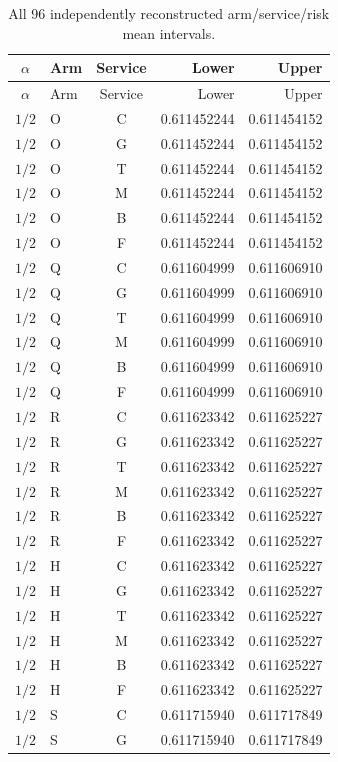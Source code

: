 \small\begin{longtable}{clcrr}
\caption{All 96 independently reconstructed arm/service/risk mean intervals.}\label{tab:means96d}\\
\hline $\alpha$ & Arm & Service & Lower & Upper \\ \hline\endfirsthead
\hline $\alpha$ & Arm & Service & Lower & Upper \\ \hline\endhead
$1/2$ & O & C & 0.611452244 & 0.611454152 \\
$1/2$ & O & G & 0.611452244 & 0.611454152 \\
$1/2$ & O & T & 0.611452244 & 0.611454152 \\
$1/2$ & O & M & 0.611452244 & 0.611454152 \\
$1/2$ & O & B & 0.611452244 & 0.611454152 \\
$1/2$ & O & F & 0.611452244 & 0.611454152 \\
$1/2$ & Q & C & 0.611604999 & 0.611606910 \\
$1/2$ & Q & G & 0.611604999 & 0.611606910 \\
$1/2$ & Q & T & 0.611604999 & 0.611606910 \\
$1/2$ & Q & M & 0.611604999 & 0.611606910 \\
$1/2$ & Q & B & 0.611604999 & 0.611606910 \\
$1/2$ & Q & F & 0.611604999 & 0.611606910 \\
$1/2$ & R & C & 0.611623342 & 0.611625227 \\
$1/2$ & R & G & 0.611623342 & 0.611625227 \\
$1/2$ & R & T & 0.611623342 & 0.611625227 \\
$1/2$ & R & M & 0.611623342 & 0.611625227 \\
$1/2$ & R & B & 0.611623342 & 0.611625227 \\
$1/2$ & R & F & 0.611623342 & 0.611625227 \\
$1/2$ & H & C & 0.611623342 & 0.611625227 \\
$1/2$ & H & G & 0.611623342 & 0.611625227 \\
$1/2$ & H & T & 0.611623342 & 0.611625227 \\
$1/2$ & H & M & 0.611623342 & 0.611625227 \\
$1/2$ & H & B & 0.611623342 & 0.611625227 \\
$1/2$ & H & F & 0.611623342 & 0.611625227 \\
$1/2$ & S & C & 0.611715940 & 0.611717849 \\
$1/2$ & S & G & 0.611715940 & 0.611717849 \\

\end{longtable}
